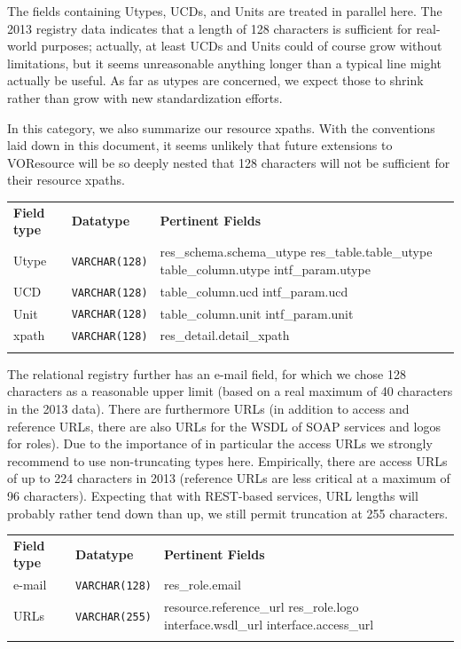 \documentclass[11pt,a4paper]{ivoa}
\begin{document}
The fields containing Utypes, UCDs, and Units are treated in parallel
here. The 2013 registry data indicates that a length of 128 characters is
sufficient for real-world purposes; actually, at least UCDs and Units
could of course grow without limitations, but it seems unreasonable
anything longer than a typical line might actually be useful.  As far as
utypes are concerned, we expect those to shrink rather than grow with
new standardization efforts.

In this category, we also summarize our resource xpaths.  With the
conventions laid down in this document, it seems unlikely that future
extensions to VOResource will be so deeply nested that 128 characters
will not be sufficient for their resource xpaths.

\begin{inlinetable}
\begin{tabular}{llp{6cm}}
\sptablerule
\textbf{Field type}&
\textbf{Datatype}&
\textbf{Pertinent Fields}\\
\sptablerule
Utype&\texttt{VARCHAR(128)}&res\_schema.schema\_utype\hfil\break
res\_table.table\_utype\hfil\break
table\_column.utype\hfil\break
intf\_param.utype\\
\sptablerule
UCD&\texttt{VARCHAR(128)}&
          table\_column.ucd\hfil\break
          intf\_param.ucd\\
\sptablerule
Unit&\texttt{VARCHAR(128)}&
          table\_column.unit\hfil\break
          intf\_param.unit\\
\sptablerule
xpath&\texttt{VARCHAR(128)}&
          res\_detail.detail\_xpath \\
\sptablerule
\end{tabular}
\end{inlinetable}

The relational registry further has an
e-mail field, for which we chose 128 characters as a reasonable upper
limit (based on a real maximum of 40 characters in the 2013 data).
There are furthermore URLs (in addition to access and reference URLs,
there are also URLs for the WSDL of SOAP services and logos for roles).
Due to the importance of in particular the access URLs we strongly
recommend to use non-truncating types here.  Empirically, there are
access URLs of up to 224 characters in 2013 (reference URLs are less
critical at a maximum of 96 characters).  Expecting that with REST-based
services, URL lengths will probably rather tend down than up, we still
permit truncation at 255 characters.


\begin{inlinetable}
\begin{tabular}{llp{6cm}}
\sptablerule
\textbf{Field type}&
\textbf{Datatype}&
\textbf{Pertinent Fields}\\
\sptablerule
e-mail&\texttt{VARCHAR(128)}&
          res\_role.email\\
\sptablerule
URLs&\texttt{VARCHAR(255)}&resource.reference\_url\hfil\break
          res\_role.logo\hfil\break
          interface.wsdl\_url\hfil\break
          interface.access\_url \\
\sptablerule
\end{tabular}
\end{inlinetable}
\end{document}
